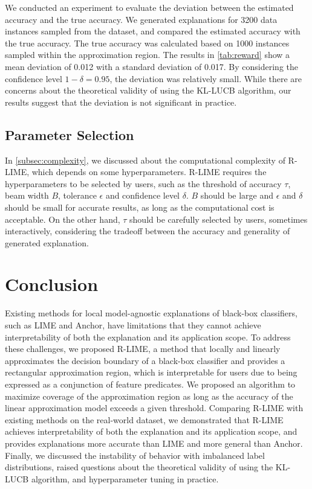 \documentclass[runningheads]{llncs}
\begin{document}
We conducted an experiment to evaluate the deviation
between the estimated accuracy and the true accuracy.
We generated explanations for 3200 data instances sampled from the dataset,
and compared the estimated accuracy with the true accuracy.
The true accuracy was calculated based on 1000 instances sampled
within the approximation region.
The results in \cref{tab:reward} show a mean deviation of 0.012
with a standard deviation of 0.017.
By considering the confidence level $1-\delta=0.95$,
the deviation was relatively small.
While there are concerns about the theoretical validity of using the KL-LUCB algorithm,
our results suggest that the deviation is not significant in practice.

\subsection{Parameter Selection}

In \cref{subsec:complexity},
we discussed about the computational complexity of R-LIME,
which depends on some hyperparameters.
R-LIME requires the hyperparameters to be selected by users,
such as the threshold of accuracy $\tau$, beam width $B$, tolerance $\epsilon$
and confidence level $\delta$.
$B$ should be large and $\epsilon$ and $\delta$ should be small for
accurate results, as long as the computational cost is acceptable.
On the other hand, $\tau$ should be carefully selected by users,
sometimes interactively, considering the tradeoff between
the accuracy and generality of generated explanation.

\section{Conclusion}
Existing methods for
local model-agnostic explanations of black-box classifiers,
such as LIME and Anchor,
have limitations that they cannot achieve interpretability of
both the explanation and its application scope.
To address these challenges,
we proposed R-LIME,
a method that locally and linearly approximates the decision boundary
of a black-box classifier and provides a rectangular approximation region,
which is interpretable for users due to being expressed as a conjunction of feature predicates.
We proposed an algorithm to
maximize coverage of the approximation region
as long as the accuracy of the linear approximation model exceeds a given threshold.
Comparing R-LIME with existing methods on the real-world dataset,
we demonstrated that R-LIME achieves interpretability of both the explanation
and its application scope,
and provides explanations more accurate than LIME and more general than Anchor.
Finally,
we discussed the instability of behavior with imbalanced label distributions,
raised questions about the theoretical validity of using the KL-LUCB algorithm,
and hyperparameter tuning in practice.

\newpage


\end{document}
